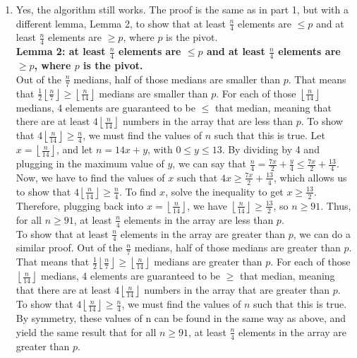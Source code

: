 \documentclass[12pt]{article}
\begin{document}
\begin{enumerate}[label=(\alph*)]
  \item Yes, the algorithm still works. The proof is the same as in part 1, but with a different lemma, Lemma 2, to show that at least $\frac{n}{4}$ elements are $\le p$ and at least $\frac{n}{4}$ elements are $\ge p$, where $p$ is the pivot.\\
  \textbf{Lemma 2: at least $\frac{n}{4}$ elements are $\le p$ and at least $\frac{n}{4}$ elements are $\ge p$, where $p$ is the pivot.}\\
  Out of the $\frac{n}{7}$ medians, half of those medians are smaller than $p$. That means that $\frac{1}{2}\left \lfloor{\frac{n}{7}}\right \rfloor \ge \left \lfloor{\frac{n}{14}}\right \rfloor$ medians are smaller than $p$. For each of those  $\left \lfloor{\frac{n}{14}}\right \rfloor$ medians, 4 elements are guaranteed to be $\le$ that median, meaning that there are at least $4\left \lfloor{\frac{n}{14}}\right \rfloor$ numbers in the array that are less than $p$. To show that $4\left \lfloor{\frac{n}{14}}\right \rfloor \ge \frac{n}{4}$, we must find the values of $n$ such that this is true. Let $x = \left \lfloor{\frac{n}{14}}\right \rfloor$, and let $n = 14x + y$, with $0 \le y \le 13$. By dividing by 4 and plugging in the maximum value of $y$, we can say that $\frac{n}{4} = \frac{7x}{2} + \frac{y}{4} \le \frac{7x}{2} + \frac{13}{4}$. Now, we have to find the values of $x$ such that $4x \ge \frac{7x}{2} + \frac{13}{4}$, which allows us to show that $4\left \lfloor{\frac{n}{14}}\right \rfloor \ge \frac{n}{4}$. To find $x$, solve the inequality to get $x \ge \frac{13}{2}$. Therefore, plugging back into $x = \left \lfloor{\frac{n}{14}}\right \rfloor$, we have $\left \lfloor{\frac{n}{14}}\right \rfloor \ge \frac{13}{2}$, so $n \ge 91$. Thus, for all $n \ge 91$, at least $\frac{n}{4}$ elements in the array are less than $p$.\\
  To show that at least $\frac{n}{4}$ elements in the array are greater than $p$, we can do a similar proof. Out of the $\frac{n}{7}$ medians, half of those medians are greater than $p$. That means that $\frac{1}{2}\left \lfloor{\frac{n}{7}}\right \rfloor \ge \left \lfloor{\frac{n}{14}}\right \rfloor$ medians are greater than $p$. For each of those  $\left \lfloor{\frac{n}{14}}\right \rfloor$ medians, 4 elements are guaranteed to be $\ge$ that median, meaning that there are at least $4\left \lfloor{\frac{n}{14}}\right \rfloor$ numbers in the array that are greater than $p$. To show that $4\left \lfloor{\frac{n}{14}}\right \rfloor \ge \frac{n}{4}$, we must find the values of $n$ such that this is true. By symmetry, these values of n can be found in the same way as above, and yield the same result that for all $n \ge 91$, at least $\frac{n}{4}$ elements in the array are greater than $p$.

\end{enumerate}
\end{document}
